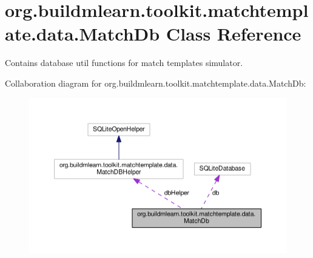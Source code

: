 \hypertarget{classorg_1_1buildmlearn_1_1toolkit_1_1matchtemplate_1_1data_1_1MatchDb}{}\section{org.\+buildmlearn.\+toolkit.\+matchtemplate.\+data.\+Match\+Db Class Reference}
\label{classorg_1_1buildmlearn_1_1toolkit_1_1matchtemplate_1_1data_1_1MatchDb}


Contains database util functions for match template\textquotesingle{}s simulator.  




Collaboration diagram for org.\+buildmlearn.\+toolkit.\+matchtemplate.\+data.\+Match\+Db\+:
\nopagebreak
\begin{figure}[H]
\begin{center}
\leavevmode
\includegraphics[width=350pt]{classorg_1_1buildmlearn_1_1toolkit_1_1matchtemplate_1_1data_1_1MatchDb__coll__graph}
\end{center}
\end{figure}
